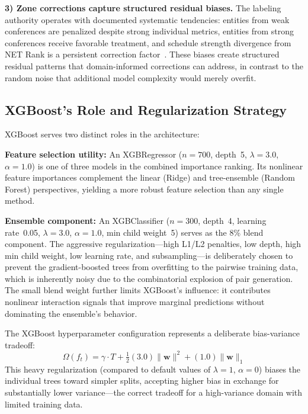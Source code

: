 \documentclass[conference]{IEEEtran}
\begin{document}
\textbf{3) Zone corrections capture structured residual biases.} The labeling authority operates with documented systematic tendencies: entities from weak conferences are penalized despite strong individual metrics, entities from strong conferences receive favorable treatment, and schedule strength divergence from NET Rank is a persistent correction factor~\cite{berry2006ncaa}. These biases create structured residual patterns that domain-informed corrections can address, in contrast to the random noise that additional model complexity would merely overfit.

\subsection{XGBoost's Role and Regularization Strategy}

XGBoost serves two distinct roles in the architecture:

\textbf{Feature selection utility:} An XGBRegressor ($n = 700$, depth~5, $\lambda = 3.0$, $\alpha = 1.0$) is one of three models in the combined importance ranking. Its nonlinear feature importances complement the linear (Ridge) and tree-ensemble (Random Forest) perspectives, yielding a more robust feature selection than any single method.

\textbf{Ensemble component:} An XGBClassifier ($n = 300$, depth~4, learning rate~0.05, $\lambda = 3.0$, $\alpha = 1.0$, min child weight~5) serves as the 8\% blend component. The aggressive regularization---high L1/L2 penalties, low depth, high min child weight, low learning rate, and subsampling---is deliberately chosen to prevent the gradient-boosted trees from overfitting to the pairwise training data, which is inherently noisy due to the combinatorial explosion of pair generation. The small blend weight further limits XGBoost's influence: it contributes nonlinear interaction signals that improve marginal predictions without dominating the ensemble's behavior.

The XGBoost hyperparameter configuration represents a deliberate bias-variance tradeoff:
\begin{equation}
\Omega(f_t) = \gamma \cdot T + \tfrac{1}{2}(3.0) \|\mathbf{w}\|^2 + (1.0) \|\mathbf{w}\|_1
\label{eq:xgb_reg_config}
\end{equation}
This heavy regularization (compared to default values of $\lambda = 1$, $\alpha = 0$) biases the individual trees toward simpler splits, accepting higher bias in exchange for substantially lower variance---the correct tradeoff for a high-variance domain with limited training data.
\end{document}
